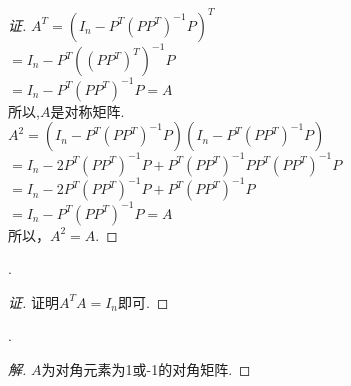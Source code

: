 \documentclass[10pt,a4paper]{report}
\begin{document}
\begin{proof}[证]
	$A^{T} = (I_{n}-P^{T}(PP^{T})^{-1}P)^{T}$\\
	$=I_{n}-P^{T}((PP^{T})^{T})^{-1}P$\\
	$=I_{n}-P^{T}(PP^{T})^{-1}P = A$\\
	所以,$A$是对称矩阵.\\
	$A^{2} = (I_{n}-P^{T}(PP^{T})^{-1}P)(I_{n}-P^{T}(PP^{T})^{-1}P)$\\
	$=I_{n}-2P^{T}(PP^{T})^{-1}P+P^{T}(PP^{T})^{-1}PP^{T}(PP^{T})^{-1}P$\\
	$=I_{n}-2P^{T}(PP^{T})^{-1}P+P^{T}(PP^{T})^{-1}P$\\
	$=I_{n}-P^{T}(PP^{T})^{-1}P = A$\\
	所以，$A^{2}=A$.
\end{proof}
.
\begin{proof}[证]
	证明$A^{T}A=I_{n}$即可.
\end{proof}
.
\begin{proof}[解]
	$A$为对角元素为1或-1的对角矩阵.
\end{proof}
\end{document}
